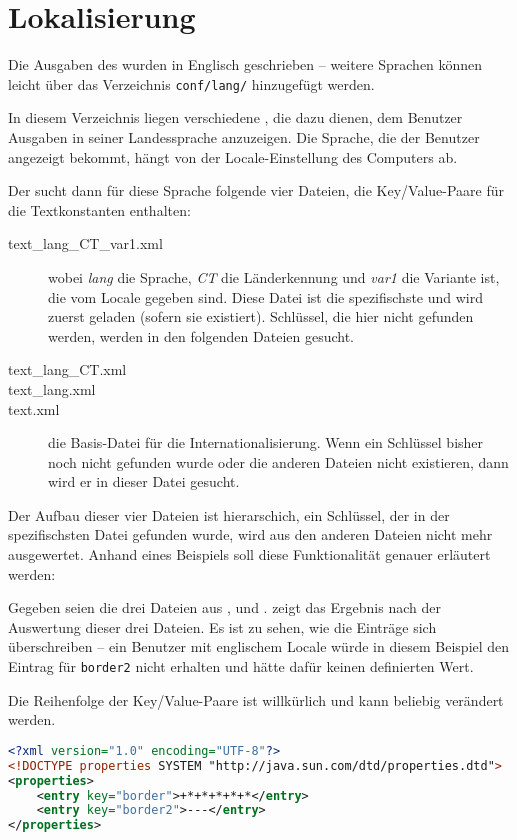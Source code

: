 \section{Lokalisierung}
Die Ausgaben des \md wurden in Englisch geschrieben -- weitere Sprachen können leicht über das Verzeichnis \texttt{conf/lang/} hinzugefügt werden.

In diesem Verzeichnis liegen verschiedene , die dazu dienen, dem Benutzer Ausgaben in seiner Landessprache anzuzeigen. Die Sprache, die der Benutzer angezeigt bekommt, hängt von der Locale-Einstellung des Computers ab.

Der \md sucht dann für diese Sprache folgende vier Dateien, die Key/Value-Paare für die Textkonstanten enthalten:
\begin{description}
\item[text_lang_CT_var1.xml] wobei \emph{lang} die Sprache, \emph{CT} die Länderkennung und \emph{var1} die Variante ist, die vom Locale gegeben sind. Diese Datei ist die spezifischste und wird zuerst geladen (sofern sie existiert). Schlüssel, die hier nicht gefunden werden, werden in den folgenden Dateien gesucht.
\item[text_lang_CT.xml]
\item[text_lang.xml]
\item[text.xml] die Basis-Datei für die Internationalisierung. Wenn ein Schlüssel bisher noch nicht gefunden wurde oder die anderen Dateien nicht existieren, dann wird er in dieser Datei gesucht.
\end{description}

Der Aufbau dieser vier Dateien ist hierarschich, ein Schlüssel, der in der spezifischsten Datei gefunden wurde, wird aus den anderen Dateien nicht mehr ausgewertet. Anhand eines Beispiels soll diese Funktionalität genauer erläutert werden:

Gegeben seien die drei Dateien aus ,  und .  zeigt das Ergebnis nach der Auswertung dieser drei Dateien. Es ist zu sehen, wie die Einträge sich überschreiben -- ein Benutzer mit englischem Locale würde in diesem Beispiel den Eintrag für \texttt{border2} nicht erhalten und hätte dafür keinen definierten Wert.

Die Reihenfolge der Key/Value-Paare ist willkürlich und kann beliebig verändert werden.

\begin{lstlisting}[language=XML,caption={Beispiel für Datei \texttt{text_de_DE.xml}},label=\lstlbl{locale-file-de-de}]
<?xml version="1.0" encoding="UTF-8"?>
<!DOCTYPE properties SYSTEM "http://java.sun.com/dtd/properties.dtd">
<properties>
	<entry key="border">+*+*+*+*+*</entry>
	<entry key="border2">---</entry>
</properties>
\end{lstlisting}

